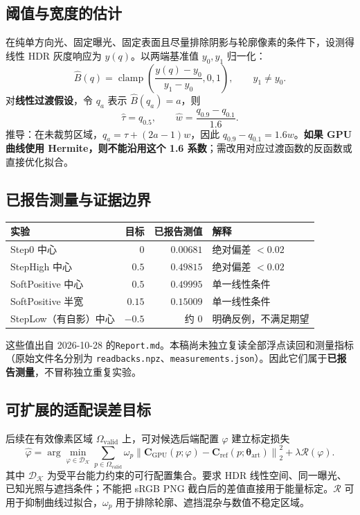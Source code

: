 \documentclass[UTF8,11pt,a4paper]{ctexart}
\newcommand{\sat}[1]{\operatorname{clamp}\!\left(#1,0,1\right)}
\newcommand{\sref}{\mathrm{ref}}
\newcommand{\sart}{\mathrm{art}}
\numberwithin{equation}{section}
\begin{document}
\subsection{阈值与宽度的估计}
在纯单方向光、固定曝光、固定表面且尽量排除阴影与轮廓像素的条件下，设测得线性 HDR 灰度响应为 $y(q)$。以两端基准值 $y_0,y_1$ 归一化：
\begin{equation}
\widehat B(q)=\sat{\frac{y(q)-y_0}{y_1-y_0}},\qquad y_1\ne y_0.
\end{equation}
对\textbf{线性过渡假设}，令 $q_{a}$ 表示 $\widehat B(q_a)=a$，则
\begin{equation}
\boxed{\widehat\tau=q_{0.5},\qquad
\widehat w=\frac{q_{0.9}-q_{0.1}}{1.6}.}
\label{eq:fitwidth}
\end{equation}
推导：在未裁剪区域，$q_a=\tau+(2a-1)w$，因此 $q_{0.9}-q_{0.1}=1.6w$。\textbf{如果 GPU 曲线使用 Hermite，则不能沿用这个 1.6 系数}；需改用对应过渡函数的反函数或直接优化拟合。

\subsection{已报告测量与证据边界}
\begin{center}
\small
\begin{tabular}{@{}lrrl@{}}
\toprule
实验 & 目标 & 已报告测值 & 解释 \\
\midrule
Step0 中心 & $0$ & $0.00681$ & 绝对偏差 $<0.02$\\
StepHigh 中心 & $0.5$ & $0.49815$ & 绝对偏差 $<0.02$\\
SoftPositive 中心 & $0.5$ & $0.49995$ & 单一线性条件\\
SoftPositive 半宽 & $0.15$ & $0.15009$ & 单一线性条件\\
StepLow（有自影）中心 & $-0.5$ & 约 $0$ & 明确反例，不满足期望\\
\bottomrule
\end{tabular}
\end{center}
这些值出自 2026-10-28 的\texttt{Report.md}。本稿尚未独立复读全部浮点读回和测量指标（原始文件名分别为 \texttt{readbacks.npz}、\texttt{measurements.json}）。因此它们属于\textbf{已报告测量}，不冒称独立重复实验。

\subsection{可扩展的适配误差目标}
后续在有效像素区域 $\Omega_{\mathrm{valid}}$ 上，可对候选后端配置 $\varphi$ 建立标定损失
\begin{equation}
\boxed{\widehat\varphi=\arg\min_{\varphi\in\mathcal D_{\mathcal K}}
\sum_{p\in\Omega_{\mathrm{valid}}}
\omega_p\left\|\mathbf C_{\mathrm{GPU}}(p;\varphi)-
\mathbf C_{\sref}(p;\boldsymbol\theta_{\sart})\right\|_2^2
+\lambda\mathcal R(\varphi).}
\label{eq:fit}
\end{equation}
其中 $\mathcal D_{\mathcal K}$ 为受平台能力约束的可行配置集合。要求 HDR 线性空间、同一曝光、已知光照与遮挡条件；不能把 sRGB PNG 截白后的差值直接用于能量标定。$\mathcal R$ 可用于抑制曲线过拟合，$\omega_p$ 用于排除轮廓、遮挡混杂与数值不稳定区域。
\end{document}

